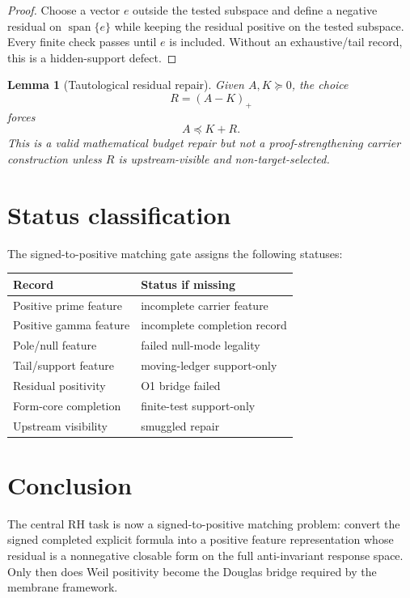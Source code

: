 \documentclass[11pt]{article}
\newtheorem{lemma}{Lemma}
\begin{document}
\begin{proof}
Choose a vector $e$ outside the tested subspace and define a negative residual on $\operatorname{span}\{e\}$ while keeping the residual positive on the tested subspace. Every finite check passes until $e$ is included. Without an exhaustive/tail record, this is a hidden-support defect.
\end{proof}

\begin{lemma}[Tautological residual repair]
Given $A,K\succeq0$, the choice
\[
  R=(A-K)_+
\]
forces
\[
  A\preceq K+R.
\]
This is a valid mathematical budget repair but not a proof-strengthening carrier construction unless $R$ is upstream-visible and non-target-selected.
\end{lemma}

\section{Status classification}
The signed-to-positive matching gate assigns the following statuses:
\begin{center}
\begin{tabular}{ll}
\hline
Record & Status if missing\\
\hline
Positive prime feature & incomplete carrier feature\\
Positive gamma feature & incomplete completion record\\
Pole/null feature & failed null-mode legality\\
Tail/support feature & moving-ledger support-only\\
Residual positivity & O1 bridge failed\\
Form-core completion & finite-test support-only\\
Upstream visibility & smuggled repair\\
\hline
\end{tabular}
\end{center}

\section{Conclusion}
The central RH task is now a signed-to-positive matching problem: convert the signed completed explicit formula into a positive feature representation whose residual is a nonnegative closable form on the full anti-invariant response space. Only then does Weil positivity become the Douglas bridge required by the membrane framework.
\end{document}
